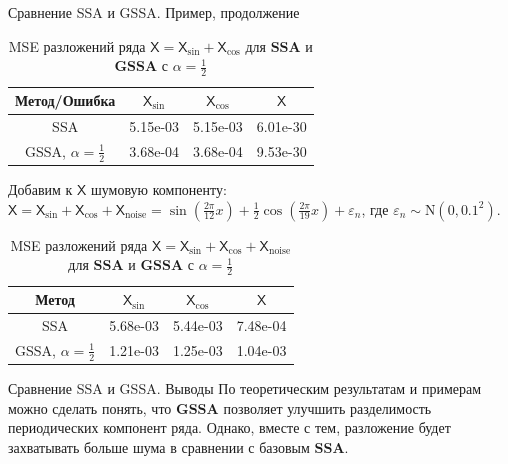 \documentclass[notheorems, handout]{beamer}
\newcommand{\SSA}{\textbf{SSA}}
\newcommand{\GSSA}{\textbf{GSSA}}
\newcommand{\TS}{\mathsf{X}}
\begin{document}
	
	\begin{frame}{Сравнение SSA и GSSA. Пример, продолжение}
		\begin{table}[H]
			\centering
			\begin{tabular}{c|ccc}
				\hline
				Метод/Ошибка & $\TS_{\sin}$ & $\TS_{\cos}$ & $\TS$ \\ 
				\hline
				SSA   & 5.15e-03 & 5.15e-03 & 6.01e-30\\ 
				GSSA, $\alpha = \frac{1}{2}$  & 3.68e-04 & 3.68e-04 & 9.53e-30 \\ 
				\hline
			\end{tabular}
			\caption{MSE разложений ряда $\TS = \TS_{\sin} + \TS_{\cos}$ для $\SSA$ и $\GSSA$ с $\alpha = \frac{1}{2}$}
			\label{tab:mse_ssa_gssa}
		\end{table}
		Добавим к $\TS$ шумовую компоненту: $\TS = \TS_{\sin} + \TS_{\cos} + \TS_{\mathrm{noise}} =
		\sin\left(\frac{2\pi}{12}x\right) +
		\frac{1}{2}\cos\left(\frac{2\pi}{19}x\right)+
		\varepsilon_n$, 
		где $\varepsilon_n \sim \mathrm N(0, 0.1^2)$.
		\begin{table}[H]
			\centering
			\begin{tabular}{c|ccc}
				\hline
				Метод & $\TS_{\sin}$ & $\TS_{\cos}$ & $\TS$ \\ 
				\hline
				SSA      & 5.68e-03 & 5.44e-03 & 7.48e-04  \\ 
				GSSA, $\alpha = \frac{1}{2}$ & 1.21e-03 & 1.25e-03 & 1.04e-03 \\
				\hline
			\end{tabular}
			\caption{MSE разложений ряда $\TS = \TS_{\sin} + \TS_{\cos} + \TS_{\mathrm{noise}}$ для $\SSA$ и $\GSSA$ с $\alpha = \frac{1}{2}$}
			\label{tab:errs_ssa_gssa}
		\end{table}
	\end{frame}
	
	
	
	\begin{frame}{Сравнение SSA и GSSA. Выводы}
		По теоретическим результатам и примерам можно сделать понять, что $\GSSA$ позволяет улучшить разделимость периодических компонент ряда. Однако, вместе с тем, разложение будет захватывать больше шума в сравнении с базовым $\SSA$.
	\end{frame}
	
\end{document}
